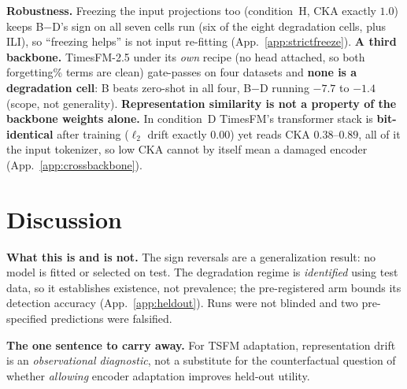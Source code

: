 \documentclass{article}
\begin{document}
\textbf{Robustness.} Freezing the input projections too (condition~H, CKA exactly $1.0$) keeps B$-$D's
sign on all seven cells run (six of the eight degradation cells, plus ILI), so ``freezing helps'' is
not input re-fitting (App.~\ref{app:strictfreeze}).
\textbf{A third backbone.} TimesFM-2.5 under its \emph{own} recipe (no head attached, so both
forgetting\% terms are clean) gate-passes on four datasets and \textbf{none is a degradation cell}: B
beats zero-shot in all four, B$-$D running $-7.7$ to $-1.4$ (scope, not generality).
\textbf{Representation similarity is not a property of the backbone weights alone.} In condition~D
TimesFM's transformer stack is \textbf{bit-identical} after
training ($\ell_2$ drift exactly $0.00$) yet reads CKA $0.38$--$0.89$, all of it the input tokenizer, so
low CKA cannot by itself mean a damaged encoder (App.~\ref{app:crossbackbone}).

\section{Discussion}
\label{sec:discussion}

\textbf{What this is and is not.} The sign reversals are a generalization result: no model is fitted
or selected on test. The degradation regime is \emph{identified} using test data, so it establishes
existence, not prevalence; the pre-registered arm bounds its detection accuracy
(App.~\ref{app:heldout}). Runs were not blinded and two pre-specified predictions were falsified.

\textbf{The one sentence to carry away.} For TSFM adaptation, representation drift is an
\emph{observational diagnostic}, not a substitute for the counterfactual question of whether
\emph{allowing} encoder adaptation improves held-out utility.

\vspace{-1mm}
\begin{center}
\end{center}
\vspace{-1mm}
\end{document}
